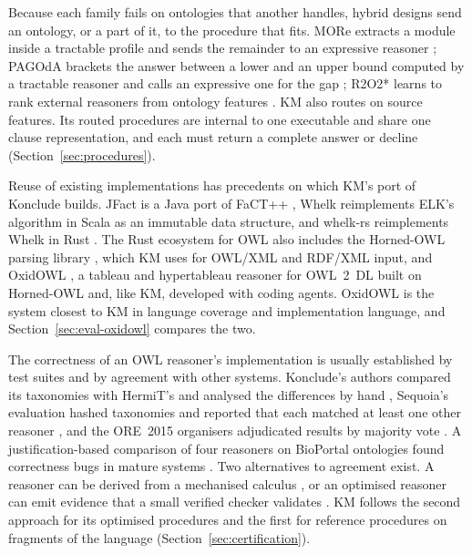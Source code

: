 Because each family fails on ontologies that another handles, hybrid designs
send an ontology, or a part of it, to the procedure that fits.  MORe extracts
a module inside a tractable profile and sends the remainder to an expressive
reasoner \cite{armasromero2012more}; PAGOdA brackets the answer between a
lower and an upper bound computed by a tractable reasoner and calls an
expressive one for the gap \cite{zhou2015pagoda}; R2O2* learns to rank
external reasoners from ontology features \cite{kang2020r2o2}.  KM also routes
on source features.  Its routed procedures are internal to one executable and
share one clause representation, and each must return a complete answer or
decline (Section~\ref{sec:procedures}).

Reuse of existing implementations has precedents on which KM's port of
Konclude builds.  JFact is a Java port of FaCT++ \cite{palmisano2018jfact},
Whelk reimplements ELK's algorithm in Scala as an immutable data structure,
and whelk-rs reimplements Whelk in Rust \cite{balhoff2024whelk,whelkrs}.  The
Rust ecosystem for OWL also includes the Horned-OWL parsing library
\cite{lord2024horned}, which KM uses for OWL/XML and RDF/XML input, and
OxidOWL \cite{sieve2026oxidowlcodingagents,oxidowl}, a tableau and hypertableau
reasoner for OWL~2~DL built on Horned-OWL and, like KM, developed with coding
agents.  OxidOWL is the system closest to KM in language coverage and
implementation language, and Section~\ref{sec:eval-oxidowl} compares the two.

The correctness of an OWL reasoner's implementation is usually established by
test suites and by agreement with other systems.  Konclude's authors compared
its taxonomies with HermiT's and analysed the differences by hand
\cite{steigmiller2014konclude}, Sequoia's evaluation hashed taxonomies and
reported that each matched at least one other reasoner
\cite{tenacucala2019sequoia}, and the ORE~2015 organisers adjudicated results
by majority vote \cite{parsia2017ore}.  A justification-based comparison of
four reasoners on BioPortal ontologies found correctness bugs in mature
systems \cite{lee2015correctness}.  Two alternatives to agreement exist.  A
reasoner can be derived from a mechanised calculus
\cite{hidalgo2014verified,ileri2024vel}, or an optimised reasoner can emit
evidence that a small verified checker validates \cite{baader2020certify}.  KM
follows the second approach for its optimised procedures and the first for
reference procedures on fragments of the language
(Section~\ref{sec:certification}).
